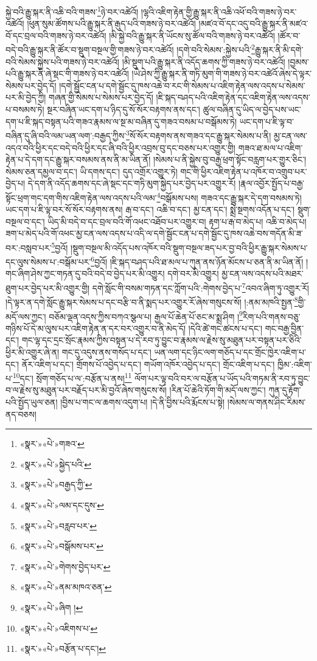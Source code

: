 སྐྱེ་བའི་རྒྱུ་སྐར་ནི་འཆི་བའི་གཟས་\footnote{«སྣར་»«པེ་»གཟའ་}ཉེ་བར་འཚེའོ། །ལྷའི་འཇིག་རྟེན་གྱི་རྒྱུ་སྐར་ནི་འཆི་འཕོ་བའི་གཟས་ཉེ་བར་འཚེའོ། །ཕུན་སུམ་ཚོགས་པའི་རྒྱུ་སྐར་ནི་རྒུད་པའི་གཟས་ཉེ་བར་འཚེའོ། །མཛའ་བོ་དང་འདུ་བའི་རྒྱུ་སྐར་ནི་མཛའ་བོ་དང་བྲལ་བའི་གཟས་ཉེ་བར་འཚེའོ། །མི་སྐྱེ་བའི་རྒྱུ་སྐར་ནི་ཡོངས་སུ་ཚོལ་བའི་གཟས་ཉེ་བར་འཚེའོ། །ཚོར་བ་བདེ་བའི་རྒྱུ་སྐར་ནི་ཚོར་བ་སྡུག་བསྔལ་གྱི་གཟས་ཉེ་བར་འཚེའོ། །དགེ་བའི་སེམས་:སྐྱེས་པའི་\footnote{«སྣར་»«པེ་»སྐྱེད་པའི་}རྒྱུ་སྐར་ནི་མི་དགེ་བའི་སེམས་སྐྱེས་པའི་གཟས་ཉེ་བར་འཚེའོ། །མི་སྡུག་པའི་རྒྱུ་སྐར་ནི་འདོད་ཆགས་ཀྱི་གཟས་ཉེ་བར་འཚེའོ། །བྱམས་པའི་རྒྱུ་སྐར་ནི་ཞེ་སྡང་གི་གཟས་ཉེ་བར་འཚེའོ། །ཡེ་ཤེས་ཀྱི་རྒྱུ་སྐར་ནི་གཏི་མུག་གི་གཟས་ཉེ་བར་འཚེའོ་ཞེས་དེ་ལྟར་སེམས་པར་བྱེད་དོ། །དགེ་སྦྱོང་ངན་པ་དགེ་སྦྱོང་དུ་ཁས་འཆེ་བ་རང་གི་སེམས་པ་འཇིག་རྟེན་ལས་འདས་པ་སེམས་པར་མི་བྱེད་ཀྱི། གཞན་གྱི་སེམས་པ་སེམས་པར་བྱེད་དོ། །ཇི་སྐད་བཤད་པའི་འཇིག་རྟེན་དང་འཇིག་རྟེན་ལས་འདས་པ་བསམས་ཏེ། སྔར་བཞིན་ཡང་དག་པ་ཉིད་དུ་སོ་སོར་བརྟགས་ནས་དང་། ཚུལ་བཞིན་དུ་ཡིད་ལ་བྱེད་པས་ཡང་དག་པ་ཇི་སྐད་བསྟན་པའི་གཟའ་རྣམས་ལ་སྔ་མ་བཞིན་དུ་གཟའ་བསམ་པ་བསྒོམས་ཏེ། ཡང་དག་པ་ཇི་ལྟ་བ་བཞིན་དུ་ཞི་བའི་ལམ་ཡན་ལག་:བརྒྱད་ཀྱིས་\footnote{«སྣར་»«པེ་»བརྒྱད་ཀྱི་}སོ་སོར་བརྟགས་ནས་གཟའ་དང་རྒྱུ་སྐར་སེམས་པ་ནི། མྱ་ངན་ལས་འདའ་བའི་ཕྱིར་དང་བདེ་བའི་ཕྱིར་དང་ཞི་བའི་ཕྱིར་འབྲས་བུ་དང་བཅས་པར་འགྱུར་གྱི། གཟའ་ཐ་མལ་པ་འཇིག་རྟེན་པ་དེ་དག་དང་རྒྱུ་སྐར་བསམས་ནས་ནི་མ་ཡིན་ནོ། །སེམས་པ་ནི་སྐྱེས་བུ་བརྒྱ་ཕྲག་སྟོང་བརླག་པར་གྱུར་ཅིང་། སེམས་ཅན་དམྱལ་བ་དང་། ཡི་དགས་དང་། དུད་འགྲོར་འགྱུར་ཏེ། གང་གི་ཕྱིར་འཇིག་རྟེན་པ་འཁོར་བ་འགྲུབ་པར་བྱེད་པ། དེ་དག་ནི་འདོད་ཆགས་དང་ཞེ་སྡང་དང་གཏི་མུག་སྐྱེད་པར་བྱེད་པར་འགྱུར་རོ། །རྣལ་འབྱོར་སྤྱོད་པ་བརྒྱ་སྟོང་ཕྲག་གང་དག་གིས་འཇིག་རྟེན་ལས་འདས་པའི་ལམ་\footnote{«སྣར་»«པེ་»ལམ་དང་དུས་}བསྒོམས་པས། གཟའ་དང་རྒྱུ་སྐར་དེ་དག་བསམས་ཏེ། ཡང་དག་པ་ཇི་ལྟ་བར་སོ་སོར་བརྟགས་ནས། རྒ་བ་དང་། འཆི་བ་དང་། མྱ་ངན་དང་། སྨྲེ་སྔགས་འདོན་པ་དང་། སྡུག་བསྔལ་བ་དང་། ཡིད་མི་བདེ་བ་དང་བྲལ་བའི་གོ་འཕང་འཐོབ་པར་འགྱུར་བ། རྟག་པ་རྒ་བ་མེད་པ། འཆི་བ་མེད་པ། ཟག་པ་མེད་པའི་གོ་འཕང་མྱ་ངན་ལས་འདས་པ་འདི་ལ་དགེ་སྦྱོང་ངན་པ་དགེ་སྦྱོང་དུ་ཁས་འཆེ་བས་གདོན་མི་ཟ་བར་:བསླབ་པར་\footnote{«སྣར་»«པེ་»བརླབ་པར་}བྱའོ། །སྡུག་བསྔལ་མི་འདོད་པས་འཁོར་བའི་སྡུག་བསྔལ་ཟད་པར་བྱ་བའི་ཕྱིར་རྒྱུ་སྐར་སེམས་པ་དང་ལུས་སེམས་པ་:བསྒོམ་པར་\footnote{«སྣར་»«པེ་»བསྒོམས་པར་}བྱའོ། །ཇི་སྐད་བཤད་པའི་ཐ་མལ་པ་ཀུན་ནས་ཉོན་མོངས་པ་ཅན་ནི་མ་ཡིན་ནོ། །གང་ཞིག་ཤེས་ཀྱང་གཏན་དུ་བའི་བདེ་བ་བྱེད་པར་མི་འགྱུར། དགེ་བར་མི་འགྱུར། མྱ་ངན་ལས་འདས་པའི་མཐར་ཐུག་པར་བྱེད་པར་མི་འགྱུར་གྱི། དགེ་སློང་གི་བསམ་གཏན་དང་ཀློག་པའི་:གེགས་བྱེད་པ་\footnote{«སྣར་»«པེ་»གེགས་བྱེད་པར་}འབའ་ཞིག་ཏུ་འགྱུར་རོ། །དེ་ལྟར་ན་དགེ་སློང་རྒྱུ་སྐར་སེམས་པ་དང་བརྩི་བ་ནི་སྨད་པར་འགྱུར་རོ་ཞེས་གསུངས་སོ། །:ནམ་མཁའི་སྤྱན་\footnote{«སྣར་»«པེ་»ནམ་མཁའ་ཅན་}གྱི་མདོ་ལས་ཀྱང་། བཅོམ་ལྡན་འདས་ཀྱིས་བཀའ་སྩལ་པ། རྒྱལ་པོ་ཆེན་པོ་ཅང་མ་སྨྲ་ཤིག །\footnote{«སྣར་»«པེ་»ཞིག །}རིག་པའི་གནས་བཅུ་གཉིས་པོ་དེ་མ་ལུས་པར་འཇིག་རྟེན་ན་དར་བར་འགྱུར་བ་ནི་མེད་དོ། །དེའི་ཚེ་གང་ཚངས་པ་དང་། གང་བརྒྱ་བྱིན་དང་། གང་ལྷ་དང་དྲང་སྲོང་རྣམས་ཀྱིས་བསྟན་པ་དེ་རབ་ཏུ་བྱུང་བ་རྣམས་ལ་རྗེས་སུ་མཐུན་པར་བསྟན་པར་ཅིའི་ཕྱིར་མི་འགྱུར་ཞེ་ན། གང་དུ་འདུས་ནས་གསོད་པ་དང་། ཡན་ལག་དང་ཉིང་ལག་གཅོད་པ་དང་གྲོང་ཁྱེར་འཇིག་པ་དང་། ནོར་འཇིག་པ་དང་། གྲོགས་པོ་འབྱེད་པ་དང་། གཡོག་འཁོར་འབྱེད་པ་དང་། གྲོང་འཇིག་པ་དང་། ཁྱིམ་:འཇིག་པ་\footnote{«སྣར་»«པེ་»འཇིགས་པ་}དང་། སྲོག་གཅོད་པ་ལ་:བརྩོན་པ་ནས།\footnote{«སྣར་»«པེ་»བརྩོན་པ་དང་།} ལོག་པར་ལྟ་བའི་བར་ལ་བརྩོན་པ་ཡོད་པའི་གཏམ་ནི་རབ་ཏུ་བྱུང་བ་ལ་རྗེས་སུ་མཐུན་པར་བརྗོད་པར་མི་བྱའོ་ཞེས་གསུངས་སོ། །རིན་པོ་ཆེའི་ཏོག་གི་མདོ་ལས་ཀྱང་། ཀུན་དུ་རྟོག་པའི་སྤྱོད་ཡུལ་ཅན། །བྱིས་པ་གང་ལ་ཆགས་འདུག་པ། །དེ་ནི་བྱིས་པའི་རྨོངས་པ་སྟེ། །སེམས་ལ་གནས་ཤིང་རིམས་ནད་བཅས། 